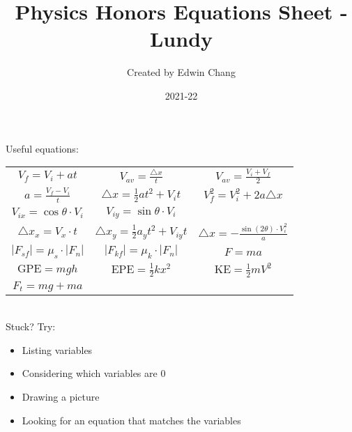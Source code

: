 \documentclass[12pt]{article}
\title{Physics Honors Equations Sheet - Lundy}
\author{Created by Edwin Chang}
\date{2021-22}
\begin{document}

\maketitle

\setlength{\parindent}{0pt} %

Useful equations:
\begin{center}
\begingroup
\setlength{\tabcolsep}{16pt} %
\renewcommand{\arraystretch}{2.25} %
\begin{tabular}{ c c c }
    $V_f = V_i + at$ & $V_{av} = \frac{\triangle x}{t}$ & $V_{av} = \frac{V_i + V_f}{2}$ \\
    $a = \frac{V_f - V_i}{t}$ & $\triangle x = \frac{1}{2}a{t^2} + V_{i}t$ & $V_{f}^{2} = V_{i}^{2} + 2a\triangle x$ \\
    $V_{ix} = \cos{\theta} \cdot V_i$ & $V_{iy} = \sin{\theta} \cdot V_i$ \\
    $\triangle x_x = V_x \cdot t$ & $\triangle x_y = \frac{1}{2} a_{y}{t^2} + V_{iy}t$ & $\triangle x = -\frac{\sin{(2\theta)} \cdot {V_{i}^2}}{a}$ \\
    $|F_{sf}|=\mu_{s}\cdot|F_{n}|$ & $|F_{kf}|=\mu_{k}\cdot|F_{n}|$ & $F=ma$ \\
    $\text{GPE}=mgh$ & $\text{EPE}=\frac{1}{2}k{x^2}$ & $\text{KE}=\frac{1}{2}m{V^2}$ \\
    $F_t=mg+ma$
\end{tabular}
\endgroup
\end{center}
\ \\
Stuck? Try:
\begin{itemize}
    \item Listing variables
    \item Considering which variables are 0
    \item Drawing a picture
    \item Looking for an equation that matches the variables
\end{itemize}
\end{document}
